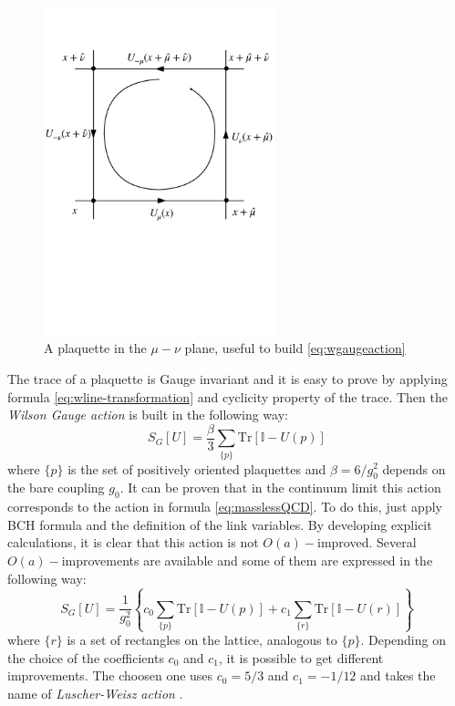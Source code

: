 \documentclass[english, LaM, oneside, noexaminfo]{sapthesis}
\newcommand{\oaid}{$O(a)-$improved}
\newcommand{\tr}{\text{Tr}}
\begin{document}
\begin{figure}[h!]
    \centering
    \includegraphics[width=0.6\textwidth]{imgs-MSc-thesis/plaquette.pdf}
    \caption{A plaquette in the $\mu-\nu$ plane, useful to build \ref{eq:wgaugeaction}}
    \label{fig:plaquette}
\end{figure}
\newline
The trace of a plaquette is Gauge invariant and it is easy to prove by applying formula \ref{eq:wline-transformation} and cyclicity property of the trace.
Then the \textit{Wilson Gauge action} is built in the following way:
\begin{equation}\label{eq:wgaugeaction}
    S_G[U] = \frac{\beta}{3}\sum_{\{p\}} \tr \left[ \mathbb{I} - U(p)\right]
\end{equation}
where $\{p\}$ is the set of positively oriented plaquettes and $\beta = 6/g_0^2$ depends on the bare coupling $g_0$.
It can be proven that in the continuum limit this action corresponds to the action in formula \ref{eq:masslessQCD}.
To do this, just apply BCH formula and the definition of the link variables.
By developing explicit calculations, it is clear that this action is not \oaid.
\newline
Several $O(a)-$improvements are available and some of them are expressed in the following way:
\begin{equation}\label{eq:gaugeaction-LuscherWeisz}
    S_G[U] = \frac{1}{g_0^2} \left\{ c_0 \sum_{\{p\}} \tr \left[ \mathbb{I} - U(p)\right] + c_1 \sum_{\{r\}} \tr \left[ \mathbb{I} - U(r)\right] \right\}
\end{equation}
where $\{r\}$ is a set of rectangles on the lattice, analogous to $\{p\}$.
Depending on the choice of the coefficients $c_{0}$ and $c_{1}$, it is possible to get different improvements.
The choosen one uses $c_0 = 5/3$ and $c_1 = -1/12$ and takes the name of \textit{Luscher-Weisz action} \cite{tmLQCD}.
\end{document}
